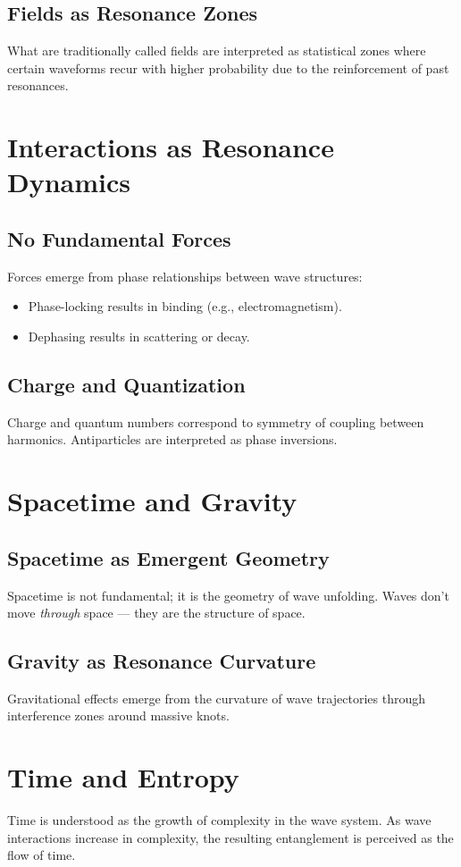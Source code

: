 \documentclass[12pt]{article}
\begin{document}
\subsection{Fields as Resonance Zones}
What are traditionally called fields are interpreted as statistical zones where certain waveforms recur with higher probability due to the reinforcement of past resonances.

\section{Interactions as Resonance Dynamics}
\subsection{No Fundamental Forces}
Forces emerge from phase relationships between wave structures:
\begin{itemize}
    \item Phase-locking results in binding (e.g., electromagnetism).
    \item Dephasing results in scattering or decay.
\end{itemize}

\subsection{Charge and Quantization}
Charge and quantum numbers correspond to symmetry of coupling between harmonics. Antiparticles are interpreted as phase inversions.

\section{Spacetime and Gravity}
\subsection{Spacetime as Emergent Geometry}
Spacetime is not fundamental; it is the geometry of wave unfolding. Waves don’t move \textit{through} space — they are the structure of space.

\subsection{Gravity as Resonance Curvature}
Gravitational effects emerge from the curvature of wave trajectories through interference zones around massive knots.

\section{Time and Entropy}
Time is understood as the growth of complexity in the wave system. As wave interactions increase in complexity, the resulting entanglement is perceived as the flow of time.
\end{document}

